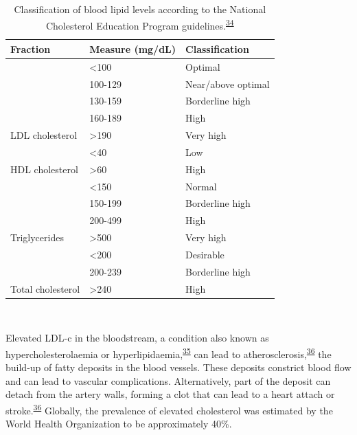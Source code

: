 \documentclass[a4paper, twoside]{templates/ociamthesis}
\begin{document}
\begin{table}[H]

\caption[Classification of blood lipid levels]{\label{tab:lipidLevels-table}Classification of blood lipid levels according to the National Cholesterol Education Program guidelines.\textsuperscript{\protect\hyperlink{ref-national2002third}{34}}}
\centering
\begin{tabular}[t]{lll}
\toprule
\textbf{Fraction} & \textbf{Measure (mg/dL)} & \textbf{Classification}\\
\midrule
 & <100 & Optimal\\
\cmidrule{2-3}
 & 100-129 & Near/above optimal\\
\cmidrule{2-3}
 & 130-159 & Borderline high\\
\cmidrule{2-3}
 & 160-189 & High\\
\cmidrule{2-3}
\multirow{-5}{*}{\raggedright\arraybackslash LDL cholesterol} & >190 & Very high\\
\cmidrule{1-3}
 & <40 & Low\\
\cmidrule{2-3}
\multirow{-2}{*}{\raggedright\arraybackslash HDL cholesterol} & >60 & High\\
\cmidrule{1-3}
 & <150 & Normal\\
\cmidrule{2-3}
 & 150-199 & Borderline high\\
\cmidrule{2-3}
 & 200-499 & High\\
\cmidrule{2-3}
\multirow{-4}{*}{\raggedright\arraybackslash Triglycerides} & >500 & Very high\\
\cmidrule{1-3}
 & <200 & Desirable\\
\cmidrule{2-3}
 & 200-239 & Borderline high\\
\cmidrule{2-3}
\multirow{-3}{*}{\raggedright\arraybackslash Total cholesterol} & >240 & High\\
\bottomrule
\end{tabular}
\end{table}

~

Elevated LDL-c in the bloodstream, a condition also known as hypercholesterolaemia or hyperlipidaemia,\textsuperscript{\protect\hyperlink{ref-nelson2013}{35}} can lead to atherosclerosis,\textsuperscript{\protect\hyperlink{ref-libby2019}{36}} the build-up of fatty deposits in the blood vessels. These deposits constrict blood flow and can lead to vascular complications. Alternatively, part of the deposit can detach from the artery walls, forming a clot that can lead to a heart attach or stroke.\textsuperscript{\protect\hyperlink{ref-libby2019}{36}} Globally, the prevalence of elevated cholesterol was estimated by the World Health Organization to be approximately 40\%.
\end{document}
